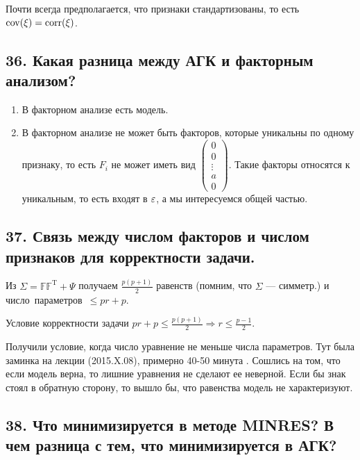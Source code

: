 \begin{note}
  Почти всегда предполагается, что признаки стандартизованы, то есть ${\rm cov}(\xi) = {\rm corr}(\xi)$.
\end{note}

\subsection*{ 36. Какая разница между АГК и факторным анализом?}

\begin{enumerate}
\item
В факторном анализе есть модель.

\item
В факторном анализе не может быть факторов, которые уникальны по одному признаку, то есть  $F_i$ не может иметь вид $
\begin{pmatrix}
  0 \\
  0 \\
  \vdots \\
  a \\
  0
\end{pmatrix}$. Такие факторы относятся к уникальным, то есть входят в $\varepsilon$, а мы интересуемся общей частью.
\end{enumerate}


\subsection*{ 37. Связь между числом факторов и числом признаков для корректности задачи.}

Из $\Sigma = \mathbb{FF^\mathrm{T}} + \Psi$ получаем $\frac{p(p+1)}{2}$ равенств (помним, что $\Sigma$ --- симметр.) и \\ число~параметров~$\leq pr+p$.

Условие корректности задачи $pr+p \leq \frac{p(p+1)}{2} \Rightarrow r \leq  \frac{p-1}{2}$.

Получили условие, когда число уравнение не меньше числа параметров. Тут была заминка на лекции (2015.X.08), примерно 40-50 минута .  Сошлись на том, что если модель верна, то лишние уравнения не сделают ее неверной. Если бы знак стоял в обратную сторону, то вышло бы, что равенства модель не характеризуют.

\subsection*{ 38. Что минимизируется в методе MINRES? В чем разница с тем, что минимизируется в АГК?}

